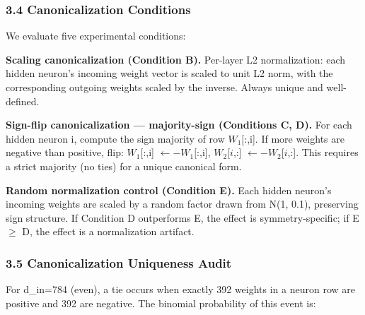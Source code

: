 \subsubsection{3.4 Canonicalization Conditions}

We evaluate five experimental conditions:

\begin{table}[htbp]
\centering
{}
\end{table}

\textbf{Scaling canonicalization (Condition B).} Per-layer L2 normalization: each hidden neuron's incoming weight vector is scaled to unit L2 norm, with the corresponding outgoing weights scaled by the inverse. Always unique and well-defined.

\textbf{Sign-flip canonicalization --- majority-sign (Conditions C, D).} For each hidden neuron i, compute the sign majority of row $W_{1}[$:,i]. If more weights are negative than positive, flip: $W_{1}[$:,i] $\leftarrow -W_{1}[$:,i], $W_{2}[i$,:] $\leftarrow -W_{2}[i$,:]. This requires a strict majority (no ties) for a unique canonical form.

\textbf{Random normalization control (Condition E).} Each hidden neuron's incoming weights are scaled by a random factor drawn from N(1, 0.1), preserving sign structure. If Condition D outperforms E, the effect is symmetry-specific; if E $\geq$ D, the effect is a normalization artifact.

\subsubsection{3.5 Canonicalization Uniqueness Audit}

For d\_in=784 (even), a tie occurs when exactly 392 weights in a neuron row are positive and 392 are negative. The binomial probability of this event is:

